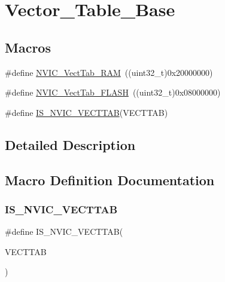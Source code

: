 \hypertarget{group___vector___table___base}{}\section{Vector\+\_\+\+Table\+\_\+\+Base}
\label{group___vector___table___base}
\subsection*{Macros}
\begin{DoxyCompactItemize}
\item 
\#define \mbox{\hyperlink{group___vector___table___base_ga8be8181cc3e5d42f6204af306ab50f80}{N\+V\+I\+C\+\_\+\+Vect\+Tab\+\_\+\+R\+AM}}~((uint32\+\_\+t)0x20000000)
\item 
\#define \mbox{\hyperlink{group___vector___table___base_gafbf92fd28a1090b2aa49732ebd5704b5}{N\+V\+I\+C\+\_\+\+Vect\+Tab\+\_\+\+F\+L\+A\+SH}}~((uint32\+\_\+t)0x08000000)
\item 
\#define \mbox{\hyperlink{group___vector___table___base_ga26b9d493ccb98fcce9a27303078940c8}{I\+S\+\_\+\+N\+V\+I\+C\+\_\+\+V\+E\+C\+T\+T\+AB}}(V\+E\+C\+T\+T\+AB)
\end{DoxyCompactItemize}


\subsection{Detailed Description}


\subsection{Macro Definition Documentation}
\mbox{\label{group___vector___table___base_ga26b9d493ccb98fcce9a27303078940c8}} 
\subsubsection{\texorpdfstring{IS\_NVIC\_VECTTAB}{IS\_NVIC\_VECTTAB}}
{\footnotesize\ttfamily \#define I\+S\+\_\+\+N\+V\+I\+C\+\_\+\+V\+E\+C\+T\+T\+AB(\begin{DoxyParamCaption}\item[{}]{V\+E\+C\+T\+T\+AB }\end{DoxyParamCaption})}

